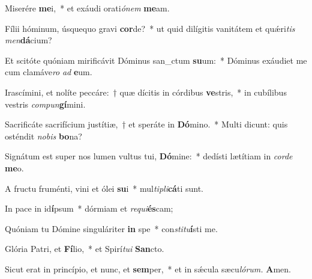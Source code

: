 \item Miserére \textbf{me}i,~* et exáudi orati\textit{ónem} \textbf{me}am.
\item Fílii hóminum, úsquequo gravi \textbf{cor}de?~* ut quid dilígitis vanitátem et quǽri\hspace{0.02em}\textit{tis} \textit{men}\textbf{dá}cium?
\item Et scitóte quóniam mirificávit Dóminus san\_ctum \textbf{su}um:~* Dóminus exáudiet me cum clamáve\hspace*{0.01em}\textit{ro} \textit{ad} \textbf{e}um.
\item Irascímini, et nolíte peccáre:~† quæ dícitis in córdibus \textbf{ve}stris,~* in cubílibus vestris \textit{compun}\textbf{gí}mini.
\item Sacrificáte sacrifícium justítiæ,~† et speráte in \textbf{Dó}mino.~* Multi dicunt: quis osténdit \textit{nobis} \textbf{bo}na?
\item Signátum est super nos lumen vultus tui, \textbf{Dó}mine:~* dedísti lætítiam in \textit{corde} \textbf{me}o.
\item A fructu fruménti, vini et ólei \textbf{su}i~* mul\textit{tipli}\textbf{cá}ti sunt.
\item In pace in id\textbf{í}psum~* dórmiam et \textit{requi}\textbf{és}cam;
\item Quóniam tu Dómine singuláriter \textbf{in} spe~* con\tinyhspace\textit{stitu}\textbf{í}sti me.
\item Glória Patri, et \textbf{Fí}lio,~* et Spirí\tinyhspace\textit{tui} \textbf{San}cto.
\item Sicut erat in princípio, et nunc, et \textbf{sem}per,~* et in sǽcula sæcu\tinyhspace\textit{lórum.} \textbf{A}men.